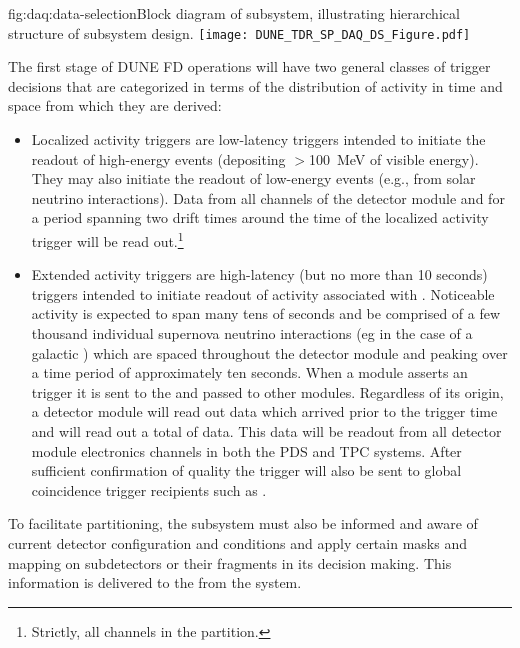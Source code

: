\begin{dunefigure}{fig:daq:data-selection}{Block diagram of  
     subsystem, illustrating hierarchical structure of
    subsystem design.}
  \texttt{[image: DUNE\_TDR\_SP\_DAQ\_DS\_Figure.pdf]}
\end{dunefigure}

The first stage of DUNE FD operations will have two general classes of trigger
decisions that are categorized in terms of the distribution of activity
in time and space from which they are derived:
\begin{itemize}
\item Localized activity triggers are low-latency triggers intended to
  initiate the readout of high-energy events (depositing $>$100~MeV of
  visible energy). 
  They may also initiate the readout of low-energy events (e.g., from
  solar neutrino interactions).
  Data from all channels of the detector module and for a period
  spanning two drift times around the time of the localized activity
  trigger will be read out.\footnote{Strictly, all channels in the  partition.}
\item Extended activity triggers are high-latency
  (but no more than 10 seconds) triggers intended to initiate readout of
  activity associated with . 
  Noticeable  activity is expected to span many tens of
  seconds and be comprised of a few thousand individual supernova
  neutrino interactions (eg in the case of a galactic ) which
  are spaced throughout the detector module and peaking over a time
  period of approximately ten seconds.
  When a module asserts an  trigger it is sent to the
   and passed to other modules. 
  Regardless of its origin, a detector module will read out data which
  arrived \snbpretime prior to the trigger time and will read out a
  total of \snbtime data. 
  This data will be readout from all detector module electronics
  channels in both the PDS and TPC systems. 
  After sufficient confirmation of quality the  trigger will
  also be sent to global coincidence trigger recipients such as
  .
\end{itemize}

To facilitate partitioning, the  subsystem must also be
informed and aware of current detector configuration and conditions and
apply certain masks and mapping on subdetectors or their fragments in
its decision making. This information is delivered to the
 from the  system.

